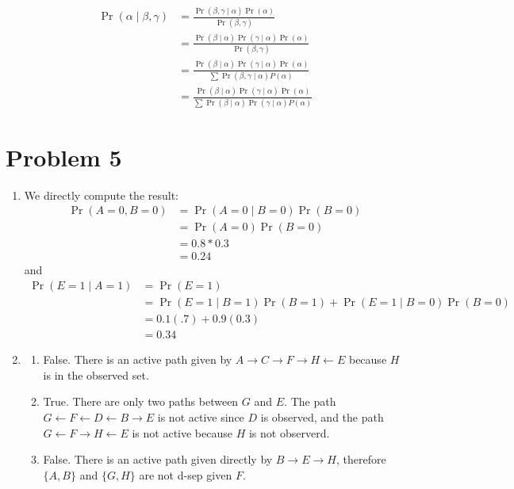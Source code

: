 \documentclass[12pt]{article}
\begin{document}
\begin{itemize}
\begin{enumerate}[label=\arabic*.]
  	\begin{align*}
			\Pr(\alpha \mid \beta, \gamma) &= \frac{\Pr(\beta, \gamma \mid \alpha)\Pr(\alpha)}{\Pr(\beta, \gamma)} \tag{Bayes' Rule} \\
			&= \frac{\Pr(\beta \mid \alpha)\Pr(\gamma \mid \alpha)\Pr(\alpha)}{\Pr(\beta, \gamma)} \tag{Conditional Independence} \\
			&= \frac{\Pr(\beta \mid \alpha)\Pr(\gamma \mid \alpha)\Pr(\alpha)}{\sum \Pr(\beta, \gamma \mid \alpha)P(\alpha)} \tag{Law of Total Probability} \\
			&= \frac{\Pr(\beta \mid \alpha)\Pr(\gamma \mid \alpha)\Pr(\alpha)}{\sum \Pr(\beta \mid \alpha)\Pr(\gamma \mid \alpha)P(\alpha)} \tag{Conditional Independence}
  	\end{align*}
 	\end{enumerate}
\end{itemize}

\pagebreak
\section*{Problem 5}
\begin{enumerate}
\item We directly compute the result:
\begin{align*}
\Pr(A = 0, B = 0) &= \Pr(A = 0 \mid B = 0) \Pr(B = 0) \\
&= \Pr(A = 0)\Pr(B = 0) \tag{$A$ and $B$ are independent since there are no active paths between them} \\
&= 0.8 * 0.3 \\
&= 0.24
\end{align*}
and
\begin{align*}
\Pr(E = 1 \mid A = 1) &=  \Pr(E = 1) \tag{$E \perp A$ since there are no active paths between $A$ and $E$} \\
&= \Pr(E = 1 \mid B = 1)\Pr(B=1) + \Pr(E = 1 \mid B = 0)\Pr(B=0) \tag{total probability}\\
&= 0.1(.7) + 0.9(0.3)\\
&= 0.34
\end{align*}
\item
\begin{enumerate}[label=(\alph*)]
\item False. There is an active path given by $A \to C \to F \to H \leftarrow E$ because $H$ is in the observed set.
\item True. There are only two paths between $G$ and $E$. The path $G \leftarrow F \leftarrow D \leftarrow B \to E$ is not active since $D$ is observed, and the path $G \leftarrow F \to H \leftarrow E$ is not active because $H$ is not observerd.
\item False. There is an active path given directly by $B \to E \to H$, therefore $\{A,B\}$ and $\{G,H\}$ are not d-sep given $F$.
\end{enumerate}
\end{enumerate}
\end{document}
